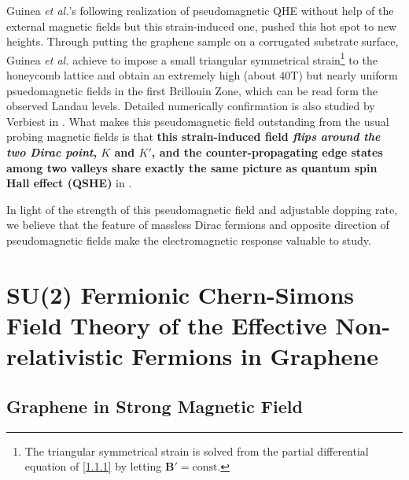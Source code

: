 \documentclass[bachelor,english,numbers]{ustcthesis}
\begin{document}
		Guinea {\it et al.}'s following realization of pseudomagnetic QHE \cite{guinea2010energy} without help of the external magnetic fields but this strain-induced one, pushed this hot spot to new heights. Through putting the graphene sample on a corrugated substrate surface, Guinea {\it et al.} achieve to impose a small triangular symmetrical strain\footnote{The triangular symmetrical strain is solved from the partial differential equation of \eqref{1.1.1} by letting $\bm{B'}=\text{const}$.} to the honeycomb lattice and obtain an extremely high (about $40\mathrm{T}$) but nearly uniform psuedomagnetic fields in the first Brillouin Zone, which can be read form the observed Landau levels. Detailed numerically confirmation is also studied by Verbiest in \cite{verbiest2015uniformity}. What makes this pseudomagnetic field outstanding from the usual probing magnetic fields is that {\bf this strain-induced field \emph{flips around the two Dirac point}, $K$ and $K'$, and the counter-propagating edge states among two valleys share exactly the same picture as quantum spin Hall effect (QSHE)} in \cite{bernevig2006quantum}.\par

		In light of the strength of this pseudomagnetic field and adjustable dopping rate, we believe that the feature of massless Dirac fermions and opposite direction of pseudomagnetic fields make the electromagnetic response valuable to study.
		
\chapter{SU(2) Fermionic Chern-Simons Field Theory of the Effective Non-relativistic Fermions in Graphene}
	\section{Graphene in Strong Magnetic Field}
\end{document}

